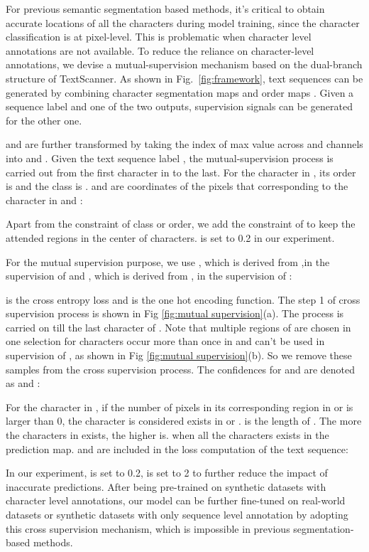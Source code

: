 \documentclass[letterpaper]{article} \usepackage{aaai20}  \usepackage{times}  \usepackage{helvet} \usepackage{courier}  \usepackage[hyphens]{url}  \usepackage{graphicx} \urlstyle{rm} \def\UrlFont{\rm}  \usepackage{graphicx}  \frenchspacing  \setlength{\pdfpagewidth}{8.5in}  \setlength{\pdfpageheight}{11in}
\begin{document}
 For previous semantic segmentation based methods, it's critical to obtain accurate locations of all the characters during model training, since the character classification is at pixel-level.  This is problematic when character level annotations are not available.  To reduce the reliance on character-level annotations, we devise a mutual-supervision mechanism based on the dual-branch structure of TextScanner. As shown in Fig.~\ref{fig:framework}, text sequences can be generated by combining character segmentation maps  and order maps . Given a sequence label and one of the two outputs, supervision signals can be generated for the other one.

  and  are further transformed by taking the index of max value across  and  channels into  and . Given the text sequence label , the mutual-supervision process is carried out from the first character in  to the last. For the  character in , its order is  and the class is .  and  are coordinates of the pixels that corresponding to the  character in  and :


Apart from the constraint of class or order, we add the constraint of  to keep the attended regions in the center of characters.  is set to 0.2 in our experiment.
 
 
 For the mutual supervision purpose, we use , which is derived from ,in the supervision of  and , which is derived from , in the supervision of :
  
 
 is the cross entropy loss and  is the one hot encoding function. The step 1 of cross supervision process is shown in Fig \ref{fig:mutual supervision}(a). The process is carried on till the last character of . Note that multiple regions of  are chosen in one selection for characters occur more than once in  and can't be used in supervision of , as shown in Fig \ref{fig:mutual supervision}(b). So we remove these samples from the cross supervision process. The confidences for  and  are denoted as  and :

 
 For the  character in , if the number of pixels in its corresponding region in  or  is larger than 0, the character is considered exists in  or .  is the length of . The more the characters in  exists, the higher  is.  when all the characters exists in the prediction map.  and  are included in the loss computation of the text sequence:



 In our experiment,  is set to 0.2,  is set to 2 to further reduce the impact of inaccurate predictions. After being pre-trained on synthetic datasets with character level annotations, our model can be further fine-tuned on real-world datasets or synthetic datasets with only sequence level annotation by adopting this cross supervision mechanism, which is impossible in previous segmentation-based methods. 
 
\end{document}
